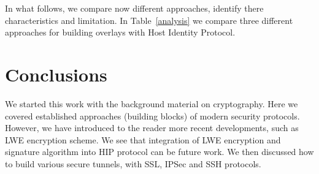 In what follows, we compare now different approaches, identify there
characteristics and limitation. In Table~\ref{analysis} we 
compare three different approaches for building overlays with Host 
Identity Protocol. 

\chapter{Conclusions}

We started this work with the background material on cryptography. Here we covered
established approaches (building blocks) of modern security protocols. However, we 
have introduced to the reader more recent developments, such as LWE encryption scheme.
We see that integration of LWE encryption and signature algorithm into HIP protocol 
can be future work. We then discussed how to build various secure tunnels, \eg with 
SSL, IPSec and SSH protocols. 


